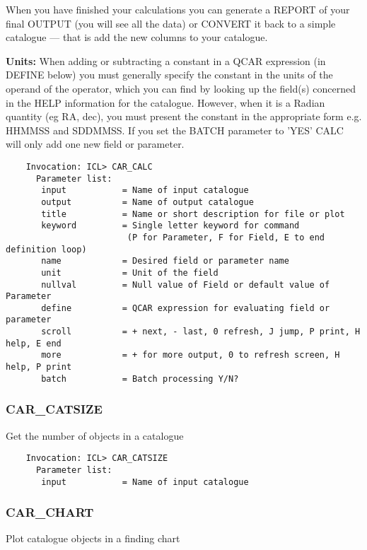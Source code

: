 When you have finished your calculations you can generate a REPORT of
your final OUTPUT (you will see all the data) or CONVERT it back to a
simple catalogue --- that is add the new columns to your catalogue.

{\bf Units:} When adding or subtracting a constant in a QCAR expression (in
DEFINE below) you must generally specify the constant in the units of the
operand of the operator, which you can find by looking up the field(s) concerned
in the HELP information for the catalogue.
However, when it is a Radian quantity (eg RA, dec), you must present the
constant in the appropriate form e.g. HHMMSS and SDDMMSS.
If you set the BATCH parameter to 'YES' CALC will only add one new field or
parameter.

\begin{verbatim}
    Invocation: ICL> CAR_CALC
      Parameter list:
       input           = Name of input catalogue
       output          = Name of output catalogue
       title           = Name or short description for file or plot
       keyword         = Single letter keyword for command
                        (P for Parameter, F for Field, E to end definition loop)
       name            = Desired field or parameter name
       unit            = Unit of the field
       nullval         = Null value of Field or default value of Parameter
       define          = QCAR expression for evaluating field or parameter
       scroll          = + next, - last, 0 refresh, J jump, P print, H help, E end
       more            = + for more output, 0 to refresh screen, H help, P print
       batch           = Batch processing Y/N?
\end{verbatim}

\subsubsection{CAR\_CATSIZE}

Get the number of objects in a catalogue

\begin{verbatim}
    Invocation: ICL> CAR_CATSIZE
      Parameter list:
       input           = Name of input catalogue
\end{verbatim}

\subsubsection{CAR\_CHART}

Plot catalogue objects in a finding chart

